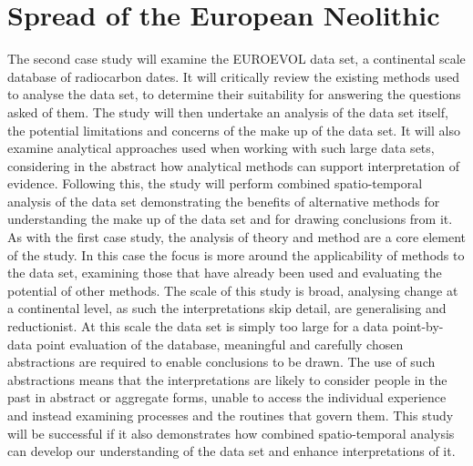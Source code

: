 \section{Spread of the European Neolithic}
The second case study will examine the EUROEVOL data set, \citep{Manning:2016fk} a continental scale database of radiocarbon dates. It will critically review the existing methods used to analyse the data set, to determine their suitability for answering the questions asked of them. The study will then undertake an analysis of the data set itself, the potential limitations and concerns of the make up of the data set. It will also examine analytical approaches used when working with such large data sets, considering in the abstract how analytical methods can support interpretation of evidence. Following this, the study will perform combined spatio-temporal analysis of the data set demonstrating the benefits of alternative methods for understanding the make up of the data set and for drawing conclusions from it. As with the first case study, the analysis of theory and method are a core element of the study. In this case the focus is more around the applicability of methods to the data set, examining those that have already been used and evaluating the potential of other methods. The scale of this study is broad, analysing change at a continental level, as such the interpretations skip detail, are generalising and reductionist. At this scale the data set is simply too large for a data point-by-data point evaluation of the database, meaningful and carefully chosen abstractions are required to enable conclusions to be drawn. The use of such abstractions means that the interpretations are likely to consider people in the past in abstract or aggregate forms, unable to access the individual experience and instead examining processes and the routines that govern them. This study will be successful if it also demonstrates how combined spatio-temporal analysis can develop our understanding of the data set and enhance interpretations of it.

